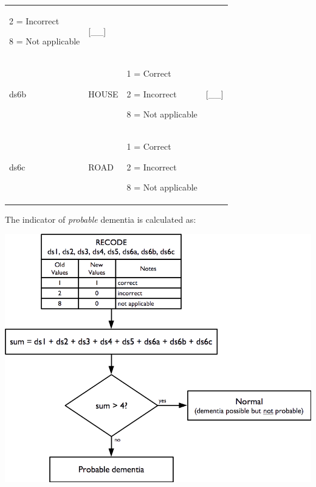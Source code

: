 \documentclass[12pt,a4paper]{book}
\theoremstyle{definition}
\theoremstyle{definition}
\theoremstyle{definition}
\theoremstyle{remark}
\begin{document}
\begin{longtable}[]{@{}llll@{}}
\begin{minipage}[t]{0.24\columnwidth}
2 = Incorrect

8 = Not applicable\strut
\end{minipage} & \begin{minipage}[t]{0.24\columnwidth}\raggedright
{[}\_\_{]}\strut
\end{minipage}\tabularnewline
\begin{minipage}[t]{0.24\columnwidth}\raggedright
ds6b\strut
\end{minipage} & \begin{minipage}[t]{0.24\columnwidth}\raggedright
HOUSE\strut
\end{minipage} & \begin{minipage}[t]{0.24\columnwidth}\raggedright
1 = Correct

2 = Incorrect

8 = Not applicable\strut
\end{minipage} & \begin{minipage}[t]{0.24\columnwidth}\raggedright
{[}\_\_{]}\strut
\end{minipage}\tabularnewline
\begin{minipage}[t]{0.24\columnwidth}\raggedright
ds6c\strut
\end{minipage} & \begin{minipage}[t]{0.24\columnwidth}\raggedright
ROAD\strut
\end{minipage} & \begin{minipage}[t]{0.24\columnwidth}\raggedright
1 = Correct

2 = Incorrect

8 = Not applicable\strut
\end{minipage} & \begin{minipage}[t]{0.24\columnwidth}\raggedright
\strut
\end{minipage}\tabularnewline
\bottomrule
\end{longtable}

The indicator of \emph{probable} dementia is calculated as:

\begin{center}\includegraphics[width=800pt]{figures/indicators20} \end{center}
\end{document}
